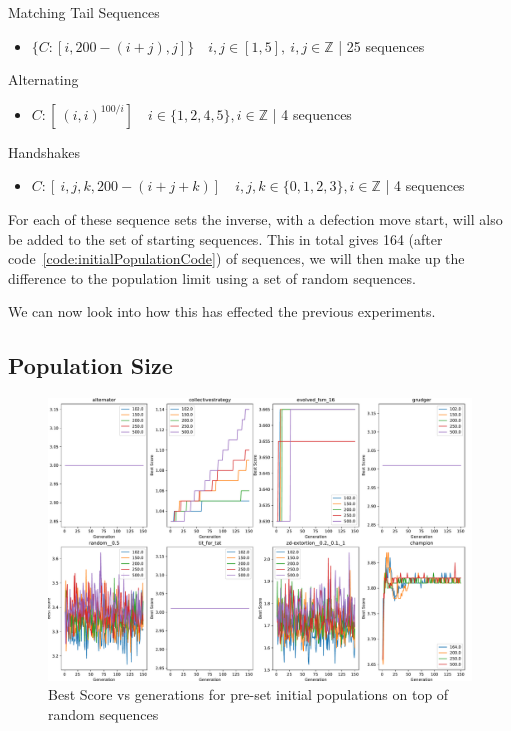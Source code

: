 Matching Tail Sequences
\begin{itemize}
    \item \(\{C:[i,200-(i+j),j]\} \quad i,j \in [1,5],\ i,j \in \mathbb{Z}\) | 25 sequences
\end{itemize}

Alternating
\begin{itemize}
    \item \(C:[\ (i,i)^{100/i}] \quad i \in \{1,2,4,5\}, i \in \mathbb{Z}\) | 4 sequences
\end{itemize}

Handshakes
\begin{itemize}
    \item \(C:[\ i,j,k,200-(i+j+k)] \quad i,j,k \in \{0,1,2,3\}, i \in \mathbb{Z}\) | 4 sequences
\end{itemize}

For each of these sequence sets the inverse, with a defection move start, will also be added to the set of starting sequences.
This in total gives 164 (after code~\ref{code:initialPopulationCode}) of sequences, we will then make up the difference to the population limit using a set of random sequences.

We can now look into how this has effected the previous experiments.

\subsection{Population Size}\label{subsec:populationSize}

\begin{figure}[ht]
    \includegraphics[width=1.0\textwidth, center]{./img/plots/NEW_INIT_POP_bs_v_gen_all_old.pdf}
    \caption{Best Score vs generations for pre-set initial populations on top of random sequences}\label{fig:NEW-INIT-POP-bs-v-gen-all}
\end{figure}

